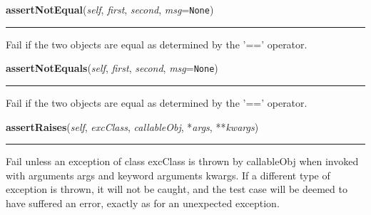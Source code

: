     \vspace{0.5ex}

    \begin{boxedminipage}{\textwidth}

    \raggedright \textbf{assertNotEqual}(\textit{self}, \textit{first}, \textit{second}, \textit{msg}=\texttt{None})

    \vspace{-1.5ex}

    \rule{\textwidth}{0.5\fboxrule}
    Fail if the two objects are equal as determined by the '==' operator.

    \vspace{1ex}

    \end{boxedminipage}

    \label{unittest:TestCase:failIfEqual}

    \vspace{0.5ex}

    \begin{boxedminipage}{\textwidth}

    \raggedright \textbf{assertNotEquals}(\textit{self}, \textit{first}, \textit{second}, \textit{msg}=\texttt{None})

    \vspace{-1.5ex}

    \rule{\textwidth}{0.5\fboxrule}
    Fail if the two objects are equal as determined by the '==' operator.

    \vspace{1ex}

    \end{boxedminipage}

    \label{unittest:TestCase:failUnlessRaises}

    \vspace{0.5ex}

    \begin{boxedminipage}{\textwidth}

    \raggedright \textbf{assertRaises}(\textit{self}, \textit{excClass}, \textit{callableObj}, *\textit{args}, **\textit{kwargs})

    \vspace{-1.5ex}

    \rule{\textwidth}{0.5\fboxrule}
    Fail unless an exception of class excClass is thrown by callableObj 
    when invoked with arguments args and keyword arguments kwargs. If a 
    different type of exception is thrown, it will not be caught, and the 
    test case will be deemed to have suffered an error, exactly as for an 
    unexpected exception.

    \vspace{1ex}

    \end{boxedminipage}

